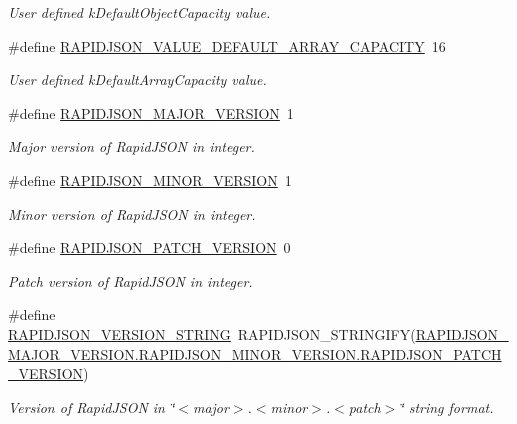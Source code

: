 \begin{DoxyCompactItemize}
\begin{DoxyCompactList}\small\item\em User defined k\+Default\+Object\+Capacity value. \end{DoxyCompactList}\item 
\#define \hyperlink{group__RAPIDJSON__CONFIG_ga10ba0ee06d0ac2803d0f2290d46b19f7}{R\+A\+P\+I\+D\+J\+S\+O\+N\+\_\+\+V\+A\+L\+U\+E\+\_\+\+D\+E\+F\+A\+U\+L\+T\+\_\+\+A\+R\+R\+A\+Y\+\_\+\+C\+A\+P\+A\+C\+I\+TY}~16
\begin{DoxyCompactList}\small\item\em User defined k\+Default\+Array\+Capacity value. \end{DoxyCompactList}\item 
\#define \hyperlink{group__RAPIDJSON__CONFIG_gaf1ff1685be6cbebb5d4b2ab997776f45}{R\+A\+P\+I\+D\+J\+S\+O\+N\+\_\+\+M\+A\+J\+O\+R\+\_\+\+V\+E\+R\+S\+I\+ON}~1
\begin{DoxyCompactList}\small\item\em Major version of Rapid\+J\+S\+ON in integer. \end{DoxyCompactList}\item 
\#define \hyperlink{group__RAPIDJSON__CONFIG_gaf9125105c593a636a79f1c2d96835376}{R\+A\+P\+I\+D\+J\+S\+O\+N\+\_\+\+M\+I\+N\+O\+R\+\_\+\+V\+E\+R\+S\+I\+ON}~1
\begin{DoxyCompactList}\small\item\em Minor version of Rapid\+J\+S\+ON in integer. \end{DoxyCompactList}\item 
\#define \hyperlink{group__RAPIDJSON__CONFIG_gaf967d31be43666ce7f53756d73bd1cdf}{R\+A\+P\+I\+D\+J\+S\+O\+N\+\_\+\+P\+A\+T\+C\+H\+\_\+\+V\+E\+R\+S\+I\+ON}~0
\begin{DoxyCompactList}\small\item\em Patch version of Rapid\+J\+S\+ON in integer. \end{DoxyCompactList}\item 
\#define \hyperlink{group__RAPIDJSON__CONFIG_gad283cfde97d9a32b7d8e8107b11f70a6}{R\+A\+P\+I\+D\+J\+S\+O\+N\+\_\+\+V\+E\+R\+S\+I\+O\+N\+\_\+\+S\+T\+R\+I\+NG}~R\+A\+P\+I\+D\+J\+S\+O\+N\+\_\+\+S\+T\+R\+I\+N\+G\+I\+FY(\hyperlink{group__RAPIDJSON__CONFIG_gaf967d31be43666ce7f53756d73bd1cdf}{R\+A\+P\+I\+D\+J\+S\+O\+N\+\_\+\+M\+A\+J\+O\+R\+\_\+\+V\+E\+R\+S\+I\+O\+N.\+R\+A\+P\+I\+D\+J\+S\+O\+N\+\_\+\+M\+I\+N\+O\+R\+\_\+\+V\+E\+R\+S\+I\+O\+N.\+R\+A\+P\+I\+D\+J\+S\+O\+N\+\_\+\+P\+A\+T\+C\+H\+\_\+\+V\+E\+R\+S\+I\+ON})
\begin{DoxyCompactList}\small\item\em Version of Rapid\+J\+S\+ON in \char`\"{}$<$major$>$.$<$minor$>$.$<$patch$>$\char`\"{} string format. \end{DoxyCompactList}\item 

\end{DoxyCompactItemize}
